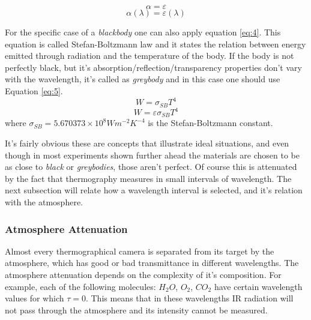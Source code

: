 \begin{equation}\label{eq:2}
\alpha=\varepsilon
\end{equation}
\begin{equation}\label{eq:3}
\alpha(\lambda)=\varepsilon(\lambda)
\end{equation}
\par For the specific case of a \textit{blackbody} one can also apply equation \ref{eq:4}. This equation is called Stefan-Boltzmann law and it states the relation between energy emitted through radiation and the temperature of the body. If the body is not perfectly black, but it's absorption/reflection/transparency properties don't vary with the wavelength, it's called as \textit{greybody} and in this case one should use Equation \ref{eq:5}.
\begin{equation}\label{eq:4}
W=\sigma_{SB} T^4
\end{equation}
\begin{equation}\label{eq:5}
W=\varepsilon \sigma_{SB} T^4
\end{equation}
where $\sigma_{SB}=5.670373 \times 10^8 W m^{-2} K^{-4}$ is the Stefan-Boltzmann constant.\\
\par It's fairly obvious these are concepts that illustrate ideal situations, and even though in most experiments shown further ahead the materials are chosen to be as close to \textit{black} or \textit{greybodies}, those aren't perfect. Of course this is attenuated by the fact that thermography measures in small intervals of wavelength. The next subsection will relate how a wavelength interval is selected, and it's relation with the atmosphere.

\subsubsection{Atmosphere Attenuation}
\label{subsec:atmat}

\par Almost every thermographical camera is separated from its target by the atmosphere, which has good or bad transmittance in different wavelengths. The atmosphere attenuation depends on the complexity of it's composition. For example, each of the following molecules: $H_2O$, $O_2$, $CO_2$ have certain wavelength values for which $\tau=0$. This means that in these wavelengths IR radiation will not pass through the atmosphere and its intensity cannot be measured.\\


